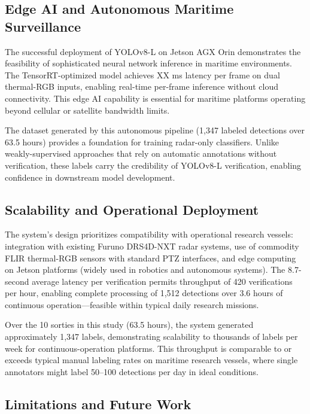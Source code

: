 \documentclass[conf]{asmeconf}
\begin{document}
\subsection{Edge AI and Autonomous Maritime Surveillance}

The successful deployment of YOLOv8-L on Jetson AGX Orin demonstrates the feasibility of sophisticated neural network inference in maritime environments. The TensorRT-optimized model achieves XX ms latency per frame on dual thermal-RGB inputs, enabling real-time per-frame inference without cloud connectivity. This edge AI capability is essential for maritime platforms operating beyond cellular or satellite bandwidth limits.

The dataset generated by this autonomous pipeline (1,347 labeled detections over 63.5 hours) provides a foundation for training radar-only classifiers. Unlike weakly-supervised approaches that rely on automatic annotations without verification, these labels carry the credibility of YOLOv8-L verification, enabling confidence in downstream model development.

\subsection{Scalability and Operational Deployment}

The system's design prioritizes compatibility with operational research vessels: integration with existing Furuno DRS4D-NXT radar systems, use of commodity FLIR thermal-RGB sensors with standard PTZ interfaces, and edge computing on Jetson platforms (widely used in robotics and autonomous systems). The 8.7-second average latency per verification permits throughput of 420 verifications per hour, enabling complete processing of 1,512 detections over 3.6 hours of continuous operation—feasible within typical daily research missions.

Over the 10 sorties in this study (63.5 hours), the system generated approximately 1,347 labels, demonstrating scalability to thousands of labels per week for continuous-operation platforms. This throughput is comparable to or exceeds typical manual labeling rates on maritime research vessels, where single annotators might label 50--100 detections per day in ideal conditions.

\subsection{Limitations and Future Work}
\end{document}
